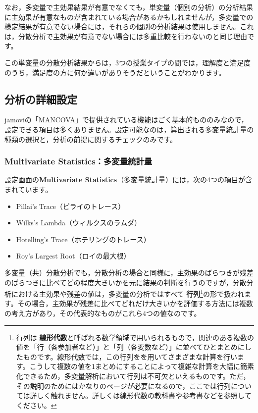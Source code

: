 \documentclass[
  12pt,
  a5jpaper,
  lualatex, ja=standard]{bxjsbook}
\providecommand{\tightlist}{%
  \setlength{\itemsep}{0pt}\setlength{\parskip}{0pt}}
\renewcommand{\emph}[1]{\textbf{\color{emph} #1}}
\newenvironment{jmvsettings}{%
	\begin{center}%
	\begin{tcolorbox}[%
		title=設定項目,
		colframe=gmoji,
		colbacktitle=gmoji,
		colback=gmoji!2!white,
		breakable,
		width=.9\textwidth,
		]\small\addtolength{\leftmargini}{-3\labelsep}%
	}%
	{\end{tcolorbox}\end{center}}
\begin{document}
なお，多変量で主効果結果が有意でなくても，単変量（個別の分析）の分析結果に主効果が有意なものが含まれている場合があるかもしれませんが，多変量での検定結果が有意でない場合には，それらの個別の分析結果は使用しません。これは，分散分析で主効果が有意でない場合には多重比較を行わないのと同じ理由です。

この単変量の分散分析結果からは，3つの授業タイプの間では，理解度と満足度のうち，満足度の方に何か違いがありそうだということがわかります。

\hypertarget{sub:ANOVA-mancova-details}{%
\subsection{分析の詳細設定}\label{sub:ANOVA-mancova-details}}

jamoviの「MANCOVA」で提供されている機能はごく基本的もののみなので，設定できる項目は多くありません。設定可能なのは，算出される多変量統計量の種類の選択と，分析の前提に関するチェックのみです。

\hypertarget{multivariate-statisticsux591aux5909ux91cfux7d71ux8a08ux91cf}{%
\subsubsection*{Multivariate Statistics：多変量統計量}\label{multivariate-statisticsux591aux5909ux91cfux7d71ux8a08ux91cf}}

設定画面の\textbf{Multivariate Statistics}（多変量統計量）には，次の4つの項目が含まれています。

\begin{jmvsettings}

\begin{itemize}
\tightlist
\item
  Pillai's Trace（ピライのトレース）
\item
  Wilks's Lambda（ウィルクスのラムダ）
\item
  Hotelling's Trace（ホテリングのトレース）
\item
  Roy's Largest Root（ロイの最大根）
\end{itemize}

\end{jmvsettings}

多変量（共）分散分析でも，分散分析の場合と同様に，主効果のばらつきが残差のばらつきに比べてどの程度大きいかを元に結果の判断を行うのですが，分散分析における主効果や残差の値は，多変量の分析ではすべて\emph{行列}\footnote{行列は\emph{線形代数}と呼ばれる数学領域で用いられるもので，関連のある複数の値を「行（各参加者など）」と「列（各変数など）」に並べてひとまとめにしたものです。線形代数では，この行列をを用いてさまざまな計算を行います。こうして複数の値を1まとめにすることによって複雑な計算を大幅に簡素化できるため，多変量解析において行列は不可欠といえるものです。ただ，その説明のためにはかなりのページが必要になるので，ここでは行列については詳しく触れません。詳しくは線形代数の教科書や参考書などを参照してください。}の形で扱われます。その場合，主効果が残差に比べてどれだけ大きいかを評価する方法には複数の考え方があり，その代表的なものがこれら4つの値なのです。
\end{document}
